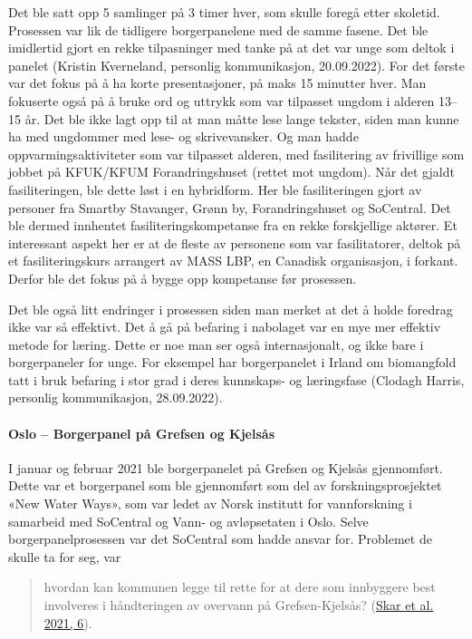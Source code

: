 \documentclass[
  12pt,
  a4paper, 12pt]{article}
\begin{document}
Det ble satt opp 5 samlinger på 3 timer hver, som skulle foregå etter skoletid. Prosessen var lik de tidligere borgerpanelene med de samme fasene. Det ble imidlertid gjort en rekke tilpasninger med tanke på at det var unge som deltok i panelet (Kristin Kverneland, personlig kommunikasjon, 20.09.2022). For det første var det fokus på å ha korte presentasjoner, på maks 15 minutter hver. Man fokuserte også på å bruke ord og uttrykk som var tilpasset ungdom i alderen 13--15 år. Det ble ikke lagt opp til at man måtte lese lange tekster, siden man kunne ha med ungdommer med lese- og skrivevansker. Og man hadde oppvarmingsaktiviteter som var tilpasset alderen, med fasilitering av frivillige som jobbet på KFUK/KFUM Forandringshuset (rettet mot ungdom). Når det gjaldt fasiliteringen, ble dette løst i en hybridform. Her ble fasiliteringen gjort av personer fra Smartby Stavanger, Grønn by, Forandringshuset og SoCentral. Det ble dermed innhentet fasiliteringskompetanse fra en rekke forskjellige aktører. Et interessant aspekt her er at de fleste av personene som var fasilitatorer, deltok på et fasiliteringskurs arrangert av MASS LBP, en Canadisk organisasjon, i forkant. Derfor ble det fokus på å bygge opp kompetanse før prosessen.

Det ble også litt endringer i prosessen siden man merket at det å holde foredrag ikke var så effektivt. Det å gå på befaring i nabolaget var en mye mer effektiv metode for læring. Dette er noe man ser også internasjonalt, og ikke bare i borgerpaneler for unge. For eksempel har borgerpanelet i Irland om biomangfold tatt i bruk befaring i stor grad i deres kunnskaps- og læringsfase (Clodagh Harris, personlig kommunikasjon, 28.09.2022).

\hypertarget{oslo-borgerpanel-puxe5-grefsen-og-kjelsuxe5s}{%
\paragraph{Oslo -- Borgerpanel på Grefsen og Kjelsås}\label{oslo-borgerpanel-puxe5-grefsen-og-kjelsuxe5s}}

I januar og februar 2021 ble borgerpanelet på Grefsen og Kjelsås gjennomført. Dette var et borgerpanel som ble gjennomført som del av forskningsprosjektet «New Water Ways», som var ledet av Norsk institutt for vannforskning i samarbeid med SoCentral og Vann- og avløpsetaten i Oslo. Selve borgerpanelprosessen var det SoCentral som hadde ansvar for. Problemet de skulle ta for seg, var

\begin{quote}
hvordan kan kommunen legge til rette for at dere som innbyggere best involveres i håndteringen av overvann på Grefsen-Kjelsås? (\protect\hyperlink{ref-skar_borgerpanel_2021}{Skar et al. 2021, 6}).
\end{quote}
\end{document}
